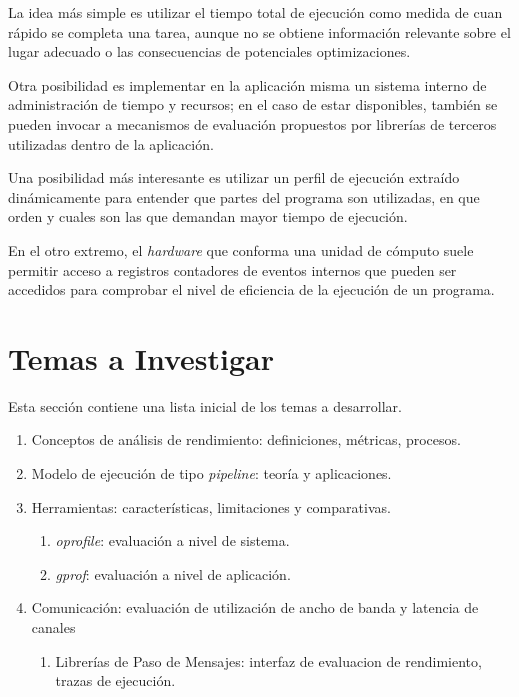 \documentclass[a4paper]{article}
\begin{document}
La idea m\'as simple es utilizar el tiempo total de ejecuci\'on como medida de
cuan r\'apido se completa una tarea, aunque no se obtiene informaci\'on
relevante sobre el lugar adecuado o las consecuencias de potenciales
optimizaciones.

\smallskip

Otra posibilidad es implementar en la aplicaci\'on misma un sistema interno de
administraci\'on de tiempo y recursos; en el caso de estar disponibles,
tambi\'en se pueden invocar a mecanismos de evaluaci\'on propuestos por
librer\'ias de terceros utilizadas dentro de la aplicaci\'on.

\smallskip

Una posibilidad m\'as interesante es utilizar un perfil de ejecuci\'on
extra\'ido din\'amicamente para entender que partes del programa son
utilizadas, en que orden y cuales son las que demandan mayor tiempo de
ejecuci\'on.

\smallskip

En el otro extremo, el {\it hardware} que conforma una unidad de c\'omputo
suele permitir acceso a registros contadores de eventos internos que pueden
ser accedidos para comprobar el nivel de eficiencia de la ejecuci\'on de un
programa.

\section{Temas a Investigar}

Esta secci\'on contiene una lista inicial de los temas a desarrollar.

\begin{enumerate}
\item Conceptos de an\'alisis de rendimiento: definiciones, m\'etricas,
  procesos.
\item Modelo de ejecuci\'on de tipo {\it pipeline}: teor\'ia y aplicaciones.
\item Herramientas: caracter\'isticas, limitaciones y comparativas.
\begin{enumerate}
\item {\it oprofile}: evaluaci\'on a nivel de sistema.
\item {\it gprof}: evaluaci\'on a nivel de aplicaci\'on.
\end{enumerate}
\item Comunicaci\'on:  evaluaci\'on de utilizaci\'on de ancho de banda y
  latencia de canales
\begin{enumerate}
\item Librer\'ias de Paso de Mensajes: interfaz de evaluacion de rendimiento,
  trazas de ejecuci\'on.
\end{enumerate}
\end{enumerate}
\end{document}
